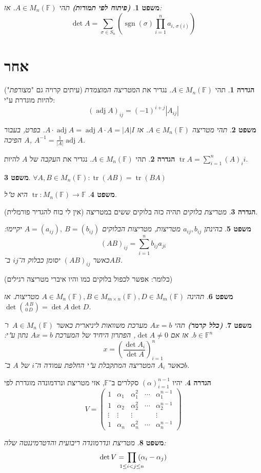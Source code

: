 \documentclass[]{article}
\DeclareMathOperator{\sgn}    {sgn}
\DeclareMathOperator{\adj}    {adj}
\DeclareMathOperator{\tr}     {tr}
\newcommand\F         {\mathbb{F}}
\newcommand\co        {\colon}
\newcommand\mat[2]    {M_{#1\times#2}}
\newcommand\gmat      {\mat{m}{n}(\F)}
\newcommand\pms[1]    {\begin{pmatrix}
		#1
\end{pmatrix}}
\newcommand\ag        {\alpha}
\newcommand\sg        {\sigma}
\newcommand\op    {^{-1}}
\newcommand\cl [1]    {\left ( #1 \right )}
\newtheorem{Theorem}{משפט}
\theoremstyle{definition}
\newtheorem{definition}{הגדרה}
\newcommand\theo  [1] {\begin{Theorem}#1\end{Theorem}}
\newcommand\defi  [1] {\begin{definition}#1\end{definition}}
\begin{document}
\begin{multicols}{2}
		\begin{Theorem}\textit{\textbf{(פיתוח לפי תמורות)}}
			תהי $A \in M_n(\F)$. אז: 
			\[ \det A = \sum_{\sg \in S_n} \cl{\sgn(\sg) \prod_{i = 1}^{n} a_{i,\,\sg(i)}} \]
		\end{Theorem}
		
		
		\section{אחר}
		\defi{תהי $A \in M_n(\F)$. נגדיר את ה\textit{מטריצה המוצמדת} (עיתים קרויה גם "\textit{מצורפת}") להיות מוגדרת ע"י: 
		\[ (\adj A)_{ij} = (-1)^{i + j}|A_{ij}| \]}
		\theo{תהי מטריצה $A \in M_n(\F)$. אז $A \cdot \adj A = \adj A \cdot A = |A| I$. בפרט, בעבור $A$ הפיכה, $A\op = \frac{1}{|A|} \adj A$. }
		
		\defi{תהי $A \in M_n(\F)$. נגדיר את ה\textit{עקבה} של $A$ להיות $\tr A = \sum_{i = 1}^{n} (A)_ii$. }
		\theo{\hfil $\forall A, B \in M_n(\F) \co \tr(AB) = \tr(BA)$}
		\theo{$\tr \co M_n(\F) \to \F$ היא ט"ל. }
		
		\defi{\textit{מטריצת בלוקים} תהיה כזה בלוקים ששים במטריצה (אין לי כוח להגדיר פורמלית). }
		\theo{בהינתן $a_{ij}, b_{ij}$ מטריצות, מטריצות הבלוקים $A = (a_{ij}), \ B = (b_{ij})$ יקיימו: 
		\[ (AB)_{ij} = \sum_{i = 1}^{n} b_{ij}a_{ji} \]
		כאשר $(AB)_{ij}$ יסומן כבלוק ה־$ij$ ב־$AB$. 
		}
		(כלומר: אפשר לכפול בלוקים כמו והיו איברי מטריצה רגילים)
		\theo{תהינה $A \in M_n(\F), B \in \gmat, D \in M_m(\F)$ מטריצות. אז $\det \binom{A \, B}{0\, D} = \det A \det D$. }
		
		\begin{Theorem}\textit{\textbf{(כלל קרמר)}}
			תהי $Ax = b$ מערכת משוואות ליניארית כאשר $A \in M_n(\F)$\ ו־$b \in \F^n$. אז אם $\det A \neq 0$, הפתרון היחיד של המערכת $Ax = b$ נתון ע"י: 
			\[ x = \cl{\frac{\det A_i}{\det A}}_{i = 1}^{n} \]
			כאשר $A_i$ המטריצה המתקבלת ע"י החלפת עמודה ה־$i$ של $A$ ב־$b$. 
		\end{Theorem}
		\defi{יהיו $(\ag)_{i = 1}^{n - 1}$ סקלרים ב־$\F$, אזי מטריצת ונרדמונדה מוגדרת לפי
			\[ V = \pms{1 & \ag_1 & \ag_1^2 & \cdots & \ag_1^{n - 1} \\ 1 & \ag_2 & \ag_2^2 & \cdots & \ag_2^{n - 1} \\ \vdots & \vdots  & \vdots && \vdots \\ 1 & \ag_n & \ag_n^{2} & \cdots & \ag_n^{n - 1}} \]
		}
		\theo{מטריצת ונדרמונדה ריבועית והדטרמיננטה שלה:
			\[\det V = \, \prod_{\mathclap{1 \le i < j \le n}}\:(\ag_i - \ag_j)\]\
		}
		
		
		
	\end{multicols}
	{\let\newpage\relax\maketitle}
	\maketitle
	
\end{document}
